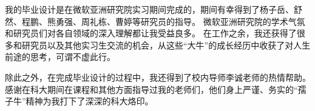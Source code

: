 
\begin{acknowledgements}

我的毕业设计是在微软亚洲研究院实习期间完成的，期间有幸得到了杨子岳、舒然、程鹏、熊勇强、周礼栋、曹婷等研究员的指导。
微软亚洲研究院的学术气氛和研究员们对各自领域的深入理解都让我受益良多。
在工作之余，我还获得了很多和研究员以及其他实习生交流的机会，从这些“大牛”的成长经历中收获了对人生前途的思考，可谓不虚此行。

除此之外，在完成毕业设计的过程中，我还得到了校内导师李诚老师的热情帮助。
感谢在科大期间在课程和其他方面指导过我的老师们，他们身上严谨、务实的“孺子牛”精神为我打下了深深的科大烙印。

\end{acknowledgements}